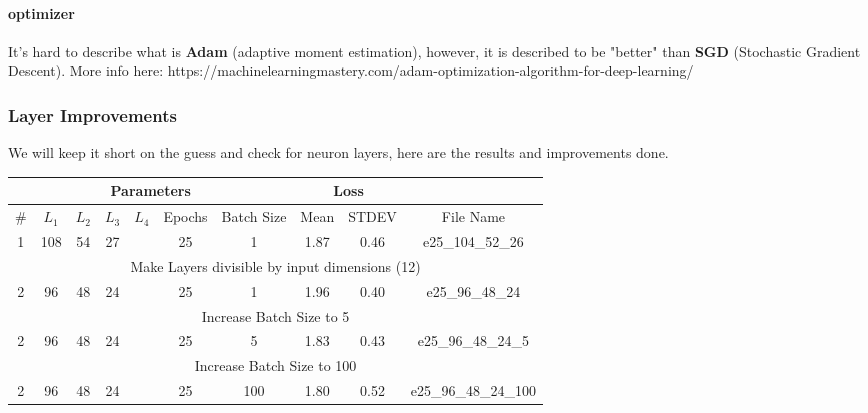 \paragraph{optimizer} It's hard to describe what is \textbf{Adam} (adaptive moment estimation), however, it is described to be "better" than \textbf{SGD} (Stochastic Gradient Descent). More info here: https://machinelearningmastery.com/adam-optimization-algorithm-for-deep-learning/

\subsubsection{Layer Improvements}

We will keep it short on the guess and check for neuron layers, here are the results and improvements done.

\begin{tabular}{|c|c|c|c|c|c|c|c|c|c|} 
\hline
\multicolumn{7}{|c|}{Parameters} & \multicolumn{2}{|c|}{Loss} & {} \\
\hline
\# & $L_1$ & $L_2$ & $L_3$ & $L_4$ & Epochs & Batch Size & Mean & STDEV & File Name \\
\hline
1 & 108 & 54 & 27 & {} & 25 & 1 & 1.87 & 0.46 & e25\_104\_52\_26 \\
\hline
\multicolumn{10}{|c|}{Make Layers divisible by input dimensions (12)} \\
\hline
2 & 96 & 48 & 24 & {} & 25 & 1 & 1.96 & 0.40 & e25\_96\_48\_24 \\
\hline
\multicolumn{10}{|c|}{Increase Batch Size to 5} \\
\hline
2 & 96 & 48 & 24 & {} & 25 & 5 & 1.83 & 0.43 & e25\_96\_48\_24\_5 \\
\hline
\multicolumn{10}{|c|}{Increase Batch Size to 100} \\
\hline
2 & 96 & 48 & 24 & {} & 25 & 100 & 1.80 & 0.52 & e25\_96\_48\_24\_100 \\
\hline
\end{tabular}	



